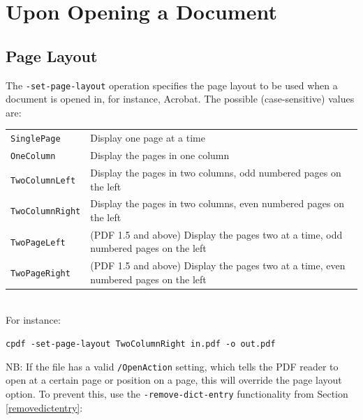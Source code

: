 \documentclass{book}
\begin{document}
\section{Upon Opening a Document}

  \subsection{Page Layout}
  The \texttt{-set-page-layout} operation specifies the page layout to be used
when a document is opened in, for instance, Acrobat. The possible
(case-sensitive) values are:

\vspace{2mm}
  {\small\begin{tabular}{ll}
    \texttt{SinglePage} & \vspace{2mm} \parbox{8cm}{Display one page at a time} \\
    \texttt{OneColumn} & \vspace{2mm} \parbox{8cm}{Display the pages in one column} \\
    \texttt{TwoColumnLeft} & \vspace{2mm} \parbox{8cm}{Display the pages in two columns, odd numbered pages on the left} \\
    \texttt{TwoColumnRight} & \vspace{2mm} \parbox{8cm}{Display the pages in two columns, even numbered pages on the left} \\
    \texttt{TwoPageLeft} & \vspace{2mm} \parbox{8cm}{(PDF 1.5 and above) Display the pages two at a time, odd numbered pages on the left} \\
    \texttt{TwoPageRight} & \vspace{2mm} \parbox{8cm}{(PDF 1.5 and above) Display the pages two at a time, even numbered pages on the left}
  \end{tabular}}\\

  \noindent For instance:
  \begin{framed}
    \noindent\small\verb!cpdf -set-page-layout TwoColumnRight in.pdf -o out.pdf!
  \end{framed}
  
\noindent NB: If the file has a valid \texttt{/OpenAction} setting, which tells the PDF reader to open at a certain page or position on a page, this will override the page layout option. To prevent this, use the \texttt{-remove-dict-entry} functionality from Section \ref{removedictentry}:
\end{document}
